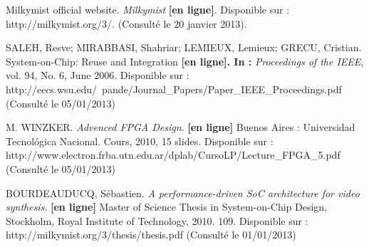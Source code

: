 \documentclass{report}
\begin{document}
\begin{thebibliography}{1}
Milkymist official website. \textit{Milkymist} \textbf{[en ligne]}. Disponible sur : http://milkymist.org/3/. (Consulté le 20 janvier 2013).


SALEH, Resve; MIRABBASI, Shahriar; LEMIEUX, Lemieux; GRECU, Cristian. System-on-Chip: Reuse and Integration \textbf{[en ligne]. In :} \textit{Proceedings of the IEEE}, vol. 94, No. 6, June 2006. Disponible sur : http://eecs.wsu.edu/~pande/Journal\_Papers/Paper\_IEEE\_Proceedings.pdf (Consulté le 05/01/2013)

M. WINZKER. \textit{Advenced FPGA Design}. \textbf{[en ligne]} Buenos Aires : Universidad Tecnológica Nacional. Cours, 2010, 15 slides. Disponible sur : http://www.electron.frba.utn.edu.ar/dplab/CursoLP/Lecture\_FPGA\_5.pdf (Consulté le 05/01/2013)

BOURDEAUDUCQ, Sébastien. \textit{A performance-driven SoC architecture for video synthesis}. \textbf{[en ligne]} Master of Science Thesis in System-on-Chip Design, Stockholm, Royal Institute of Technology, 2010. 109. Disponible sur : http://milkymist.org/3/thesis/thesis.pdf (Consulté le 01/01/2013)

\end{thebibliography}
\end{document}

